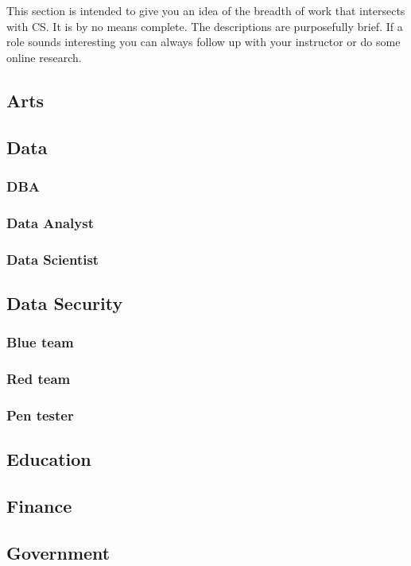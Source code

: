 This section is intended to give you an idea of the breadth of work that intersects with CS. It is by no means complete. The descriptions are purposefully brief. If a role sounds interesting you can always follow up with your instructor or do some online research.

\subsection{Arts}

\subsection{Data}
\subsubsection{DBA}
\subsubsection{Data Analyst}
\subsubsection{Data Scientist}

\subsection{Data Security}
\subsubsection{Blue team}
\subsubsection{Red team}
\subsubsection{Pen tester}

\subsection{Education}

\subsection{Finance}

\subsection{Government}


